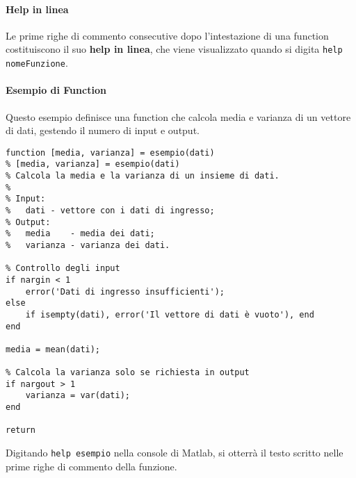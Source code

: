 \paragraph{Help in linea}
Le prime righe di commento consecutive dopo l'intestazione di una function costituiscono il suo \textbf{help in linea}, che viene visualizzato quando si digita \texttt{help nomeFunzione}.

\paragraph{Esempio di Function}
Questo esempio definisce una function che calcola media e varianza di un vettore di dati, gestendo il numero di input e output.

\begin{lstlisting}
function [media, varianza] = esempio(dati)
% [media, varianza] = esempio(dati)
% Calcola la media e la varianza di un insieme di dati.
%
% Input:
%   dati - vettore con i dati di ingresso;
% Output:
%   media    - media dei dati;
%   varianza - varianza dei dati.

% Controllo degli input
if nargin < 1
    error('Dati di ingresso insufficienti');
else
    if isempty(dati), error('Il vettore di dati è vuoto'), end
end

media = mean(dati);

% Calcola la varianza solo se richiesta in output
if nargout > 1
    varianza = var(dati);
end

return
\end{lstlisting}

Digitando \texttt{help esempio} nella console di Matlab, si otterrà il testo scritto nelle prime righe di commento della funzione.
